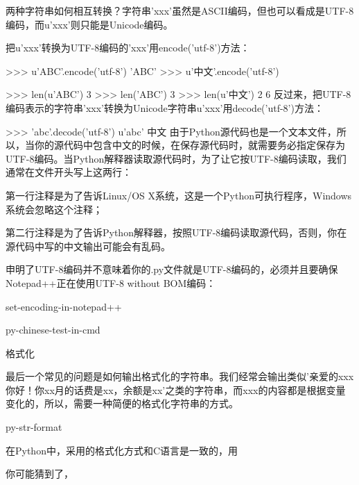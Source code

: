 两种字符串如何相互转换？字符串'xxx'虽然是ASCII编码，但也可以看成是UTF-8编码，而u'xxx'则只能是Unicode编码。

把u'xxx'转换为UTF-8编码的'xxx'用encode('utf-8')方法：

>>> u'ABC'.encode('utf-8')
'ABC'
>>> u'中文'.encode('utf-8')

>>> len(u'ABC')
3
>>> len('ABC')
3
>>> len(u'中文')
2
6
反过来，把UTF-8编码表示的字符串'xxx'转换为Unicode字符串u'xxx'用decode('utf-8')方法：

>>> 'abc'.decode('utf-8')
u'abc'
中文
由于Python源代码也是一个文本文件，所以，当你的源代码中包含中文的时候，在保存源代码时，就需要务必指定保存为UTF-8编码。当Python解释器读取源代码时，为了让它按UTF-8编码读取，我们通常在文件开头写上这两行：

第一行注释是为了告诉Linux/OS X系统，这是一个Python可执行程序，Windows系统会忽略这个注释；

第二行注释是为了告诉Python解释器，按照UTF-8编码读取源代码，否则，你在源代码中写的中文输出可能会有乱码。


申明了UTF-8编码并不意味着你的.py文件就是UTF-8编码的，必须并且要确保Notepad++正在使用UTF-8 without BOM编码：

set-encoding-in-notepad++


py-chinese-test-in-cmd

格式化

最后一个常见的问题是如何输出格式化的字符串。我们经常会输出类似'亲爱的xxx你好！你xx月的话费是xx，余额是xx'之类的字符串，而xxx的内容都是根据变量变化的，所以，需要一种简便的格式化字符串的方式。

py-str-format

在Python中，采用的格式化方式和C语言是一致的，用%

你可能猜到了，%


